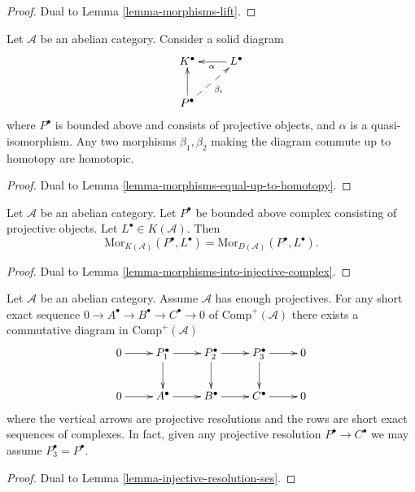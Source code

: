 \begin{proof}
Dual to
Lemma \ref{lemma-morphisms-lift}.
\end{proof}

\begin{lemma}
\label{lemma-morphisms-equal-up-to-homotopy-projective}
Let $\mathcal{A}$ be an abelian category. Consider a solid diagram
$$
\xymatrix{
K^\bullet & L^\bullet \ar[l]^\alpha \\
P^\bullet \ar[u] \ar@{-->}[ru]_{\beta_i} 
}
$$
where $P^\bullet$ is bounded above and consists of projective
objects, and $\alpha$ is a quasi-isomorphism.
Any two morphisms $\beta_1, \beta_2$ making the diagram commute
up to homotopy are homotopic.
\end{lemma}

\begin{proof}
Dual to
Lemma \ref{lemma-morphisms-equal-up-to-homotopy}.
\end{proof}

\begin{lemma}
\label{lemma-morphisms-from-projective-complex}
Let $\mathcal{A}$ be an abelian category.
Let $P^\bullet$ be bounded above complex consisting of projective
objects. Let $L^\bullet \in K(\mathcal{A})$. Then
$$
\text{Mor}_{K(\mathcal{A})}(P^\bullet, L^\bullet)
=
\text{Mor}_{D(\mathcal{A})}(P^\bullet, L^\bullet).
$$
\end{lemma}

\begin{proof}
Dual to
Lemma \ref{lemma-morphisms-into-injective-complex}.
\end{proof}

\begin{lemma}
\label{lemma-projective-resolution-ses}
Let $\mathcal{A}$ be an abelian category.
Assume $\mathcal{A}$ has enough projectives.
For any short exact sequence
$0 \to A^\bullet \to B^\bullet \to C^\bullet \to 0$
of $\text{Comp}^{+}(\mathcal{A})$ there exists a
commutative diagram in $\text{Comp}^{+}(\mathcal{A})$
$$
\xymatrix{
0 \ar[r] &
P_1^\bullet \ar[r] \ar[d] &
P_2^\bullet \ar[r] \ar[d] &
P_3^\bullet \ar[r] \ar[d] &
0 \\
0 \ar[r] &
A^\bullet \ar[r] &
B^\bullet \ar[r] &
C^\bullet \ar[r] &
0
}
$$
where the vertical arrows are projective resolutions and
the rows are short exact sequences of complexes.
In fact, given any projective resolution $P^\bullet \to C^\bullet$
we may assume $P_3^\bullet = P^\bullet$.
\end{lemma}

\begin{proof}
Dual to
Lemma \ref{lemma-injective-resolution-ses}.
\end{proof}

